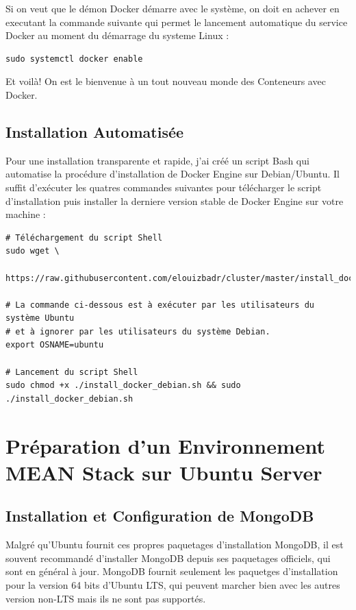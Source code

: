 \documentclass[a4paper,11pt,oneside]{report}
\begin{document}
\begin{appendices}
Si on veut que le démon Docker démarre avec le système, on doit en achever en executant la commande suivante qui permet le lancement automatique du service Docker au moment du démarrage du systeme Linux :

\begin{verbatim}
sudo systemctl docker enable
\end{verbatim}


Et voilà! On est le bienvenue à un tout nouveau monde des Conteneurs avec Docker.

\newpage

\section{Installation Automatisée}

Pour une installation transparente et rapide, j'ai créé un script Bash qui automatise la procédure d'installation de Docker Engine sur Debian/Ubuntu. Il suffit d'exécuter les quatres commandes suivantes pour télécharger le script d'installation puis installer la derniere version stable de Docker Engine sur votre machine :

\begin{verbatim}
# Téléchargement du script Shell
sudo wget \
  https://raw.githubusercontent.com/elouizbadr/cluster/master/install_docker_debian.sh

# La commande ci-dessous est à exécuter par les utilisateurs du système Ubuntu
# et à ignorer par les utilisateurs du système Debian.
export OSNAME=ubuntu 

# Lancement du script Shell
sudo chmod +x ./install_docker_debian.sh && sudo ./install_docker_debian.sh
\end{verbatim}

\chapter{Préparation d'un Environnement MEAN Stack sur Ubuntu Server}

\newpage

\section{Installation et Configuration de MongoDB}
Malgré qu'Ubuntu fournit ces propres paquetages d'installation MongoDB, il est souvent recommandé d'installer MongoDB depuis ses paquetages officiels, qui sont en général à jour. MongoDB fournit seulement les paquetges d'installation pour la version 64 bits d'Ubuntu LTS, qui peuvent marcher bien avec les autres version non-LTS mais ils ne sont pas supportés.
\newline


\end{appendices}
\end{document}
